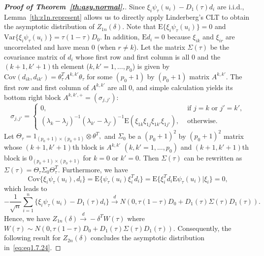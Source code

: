 \documentclass[times,sort&compress,3p]{elsarticle}
\theoremstyle{plain}%
\theoremstyle{definition}
\newcommand{\bD}{{D}}
\newcommand{\bW}{{W}}
\newcommand{\bxi}{{\xi}}
\newcommand{\E}{\mathrm{E}}
\begin{document}
\begin{proof}[\textbf{\upshape Proof of Theorem~\ref{th:asy.normal}.}]
Since $\bxi_{i} \psi_{\tau}(u_i) - \bD_1 (\tau) {d}_i$ are i.i.d., Lemma~\ref{th:z1n.represent} allows us to directly apply Linderberg's CLT to obtain the asymptotic distribution of $Z_{1n}({\delta})$. Note that $\text{E}\{\bxi_{i} \psi_{\tau}(u_i)\} = 0$ and $\text{Var} \{\bxi_{i} \psi_{\tau}(u_i)\} = \tau(1 - \tau)\bD_0.$ In addition, $\text{E} {d}_i = {0}$ because $\xi_{ik}$ and $\xi_{ir}$ are uncorrelated and have mean 0 (when $r \neq k$). Let the matrix ${\Sigma}(\tau)$ be the covariance matrix of $d_i$ whose first row and first column is all 0 and the $(k + 1, k' + 1)$th element ($k, k' = 1, \ldots, p_0$) is given by $\text{Cov}(d_{ik}, d_{ik'}) = \theta_{\tau}^T A^{k, k'} \theta_{\tau}$
for some $(p_0 + 1)$ by $(p_0 + 1)$ matrix $A^{k, k'}$.  The first row and first column of $A^{k, k'}$ are all 0, and simple calculation yields its bottom right block $A^{k, k', +} = (\sigma_{j, j'})$: 
\[
\sigma_{j, j'}  =\begin{cases}
0, & \text{ if } j  = k \text{ or }  j' = k',\\
\label{eq:covariance.inflat}
(\lambda_k - \lambda_j)^{-1}(\lambda_{k'} - \lambda_{j'})^{-1} \E(\xi_{1 k} \xi_{1 j} \xi_{1k'} \xi_{1 j'}), &  \text { otherwise. }
\end{cases}
\]
Let ${\Theta}_{\tau} = 1_{(p_0 + 1)\times (p_0 + 1)} \otimes \theta^T, $ and $\Sigma_0$ be a $(p_0 + 1)^2$ by $(p_0 + 1)^2$ matrix whose $(k + 1, k' + 1)$th block is $A^{k, k'}$ $(k, k' = 1, \ldots, p_0)$ and $(k + 1, k' + 1)$th block is $0_{(p_0 + 1) \times (p_0 + 1)}$ for $k = 0$ or $k' = 0$. Then $\Sigma(\tau)$ can be rewritten as $\Sigma(\tau) = \Theta_{\tau} \Sigma_0 \Theta_{\tau}^T$. 
Furthermore, we have 
\begin{equation}
\text{Cov}\{\bxi_{i} \psi_{\tau}(u_i), {d}_i\} = \text{E} \{\psi_{\tau}(u_i) \bxi_{i}^T {d}_i \}=
\E\{\bxi_{i}^T {d}_i \text{E} \psi_{\tau}(u_i) | \bxi_i \} = 0, 
 \end{equation}
 which leads to 
\begin{equation}
-\frac{1}{\sqrt{n}} \sum_{i = 1}^n \{ \bxi_{i} \psi_\tau({u}_i) - \bD_1(\tau) {d}_i\} \overset{d}{\rightarrow} N(0, \tau(1 - \tau)\bD_0 + \bD_1(\tau) \Sigma(\tau) \bD_1(\tau)). 
\end{equation} Hence, we have $Z_{1n}({\delta})  \overset{d}{\rightarrow} -{\delta}^T \bW(\tau)$ where $\bW(\tau)\sim N\left(0, \tau(1 - \tau)\bD_0 + \bD_1(\tau) {\Sigma}(\tau) \bD_1(\tau)\right)$. Consequently, the following result for $Z_{2n}({\delta})$ concludes the asymptotic distribution in~\eqref{eq:eq1.7.24}. 



\end{proof}
\end{document}
